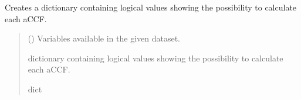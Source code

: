 \documentclass[a4paper,11pt,english]{sphinxmanual}
\begin{document}
\begin{fulllineitems}
\label{\detokenize{modules:envlib.extract_data.logic_cal_accfs}}
\pysigstartsignatures
{}
\pysigstopsignatures
\sphinxAtStartPar
Creates a dictionary containing logical values showing the possibility to calculate each aCCF.
\begin{quote}\begin{description}
\sphinxAtStartPar
{} () \textendash{} Variables available in the given dataset.

\sphinxAtStartPar
dictionary containing logical values showing the possibility to calculate each aCCF.

\sphinxAtStartPar
dict

\end{description}\end{quote}

\end{fulllineitems}

\label{\detokenize{modules:module-envlib.extend_dim}}
\end{document}
